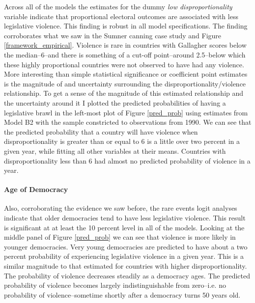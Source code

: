 \documentclass[a4paper]{article}\usepackage[]{graphicx}\usepackage[]{color}
\begin{document}
Across all of the models the estimates for the dummy {\emph{low disproportionality}} variable indicate that proportional electoral outcomes are associated with less legislative violence. This finding is robust in all model specifications. The finding corroborates what we saw in the Sumner canning case study and Figure \ref{framework_empirical}. Violence is rare in countries with Gallagher scores below the median--6--and there is something of a cut-off point--around 2.5--below which these highly proportional countries were not observed to have had any violence. More interesting than simple statistical significance or coefficient point estimates is the magnitude of and uncertainty surrounding the disproportionality/violence relationship. To get a sense of the magnitude of this estimated relationship and the uncertainty around it \citep[see][]{King2000} I plotted the predicted probabilities of having a legislative brawl in the left-most plot of Figure \ref{pred_prob} using estimates from Model B2 with the sample constricted to observations from 1990. We can see that the predicted probability that a country will have violence when disproportionality is greater than or equal to 6 is a little over two percent in a given year, while fitting all other variables at their means. Countries with disproportionality less than 6 had almost no predicted probability of violence in a year.

\paragraph{Age of Democracy}

Also, corroborating the evidence we saw before, the rare events logit analyses indicate that older democracies tend to have less legislative violence. This result is significant at at least the 10 percent level in all of the models. Looking at the middle panel of Figure \ref{pred_prob} we can see that violence is more likely in younger democracies. Very young democracies are predicted to have about a two percent probability of experiencing legislative violence in a given year. This is a similar magnitude to that estimated for countries with higher disproportionality. The probability of violence decreases steadily as a democracy ages. The predicted probability of violence becomes largely indistinguishable from zero--i.e. no probability of violence--sometime shortly after a democracy turns 50 years old.
\end{document}
